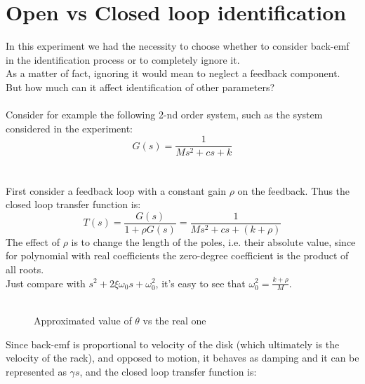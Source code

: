 \section{Open vs Closed loop identification}
\label{olvscl}
In this experiment we had the necessity to choose whether to consider back-emf in the identification process or to completely ignore it. \\
As a matter of fact, ignoring it would mean to neglect a feedback component. But how much can it affect identification of other parameters?
\\ \\
Consider for example the following 2-nd order system, such as the system considered in the experiment:
\begin{equation}G(s) = \frac{1}{Ms^2+cs+k}\end{equation}
\\ \\
First consider a feedback loop with a constant gain $\rho$ on the feedback. Thus the closed loop transfer function is:
\begin{equation}T(s) = \frac{G(s)}{1+\rho G(s)} = \frac{1}{Ms^2+cs+(k+\rho )}\end{equation}
The effect of $\rho$ is to change the length of the poles, i.e. their absolute value, since for polynomial with real coefficients the zero-degree coefficient is the product of all roots. \\
Just compare with $s^2+2\xi \omega_0 s+ \omega_0^2$, it's easy to see that $\omega_0^2 = \frac{k+\rho}{M}$.
\\\ \\
\begin{wrapfigure}{r}{0.4\textwidth}
\caption{Approximated value of $\theta$ vs the real one} \label{fig:theta_comparison}
\end{wrapfigure}
Since back-emf is proportional to velocity of the disk (which ultimately is the velocity of the rack), and opposed to motion, it behaves as damping and it can be represented as $\gamma s$, and the closed loop transfer function is:
